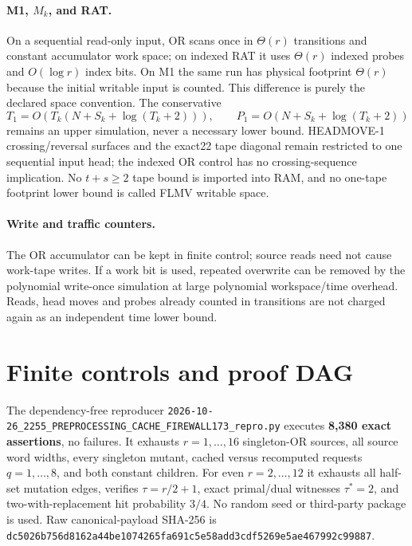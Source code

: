 \documentclass[11pt]{article}
\begin{document}
\paragraph{M1, $M_k$, and RAT.}
On a sequential read-only input, OR scans once in $\Theta(r)$ transitions and constant accumulator work space; on indexed RAT it uses $\Theta(r)$ indexed probes and $O(\log r)$ index bits.  On M1 the same run has physical footprint $\Theta(r)$ because the initial writable input is counted.  This difference is purely the declared space convention.  The conservative
\[
T_1=O(T_k(N+S_k+\log(T_k+2))),\qquad
P_1=O(N+S_k+\log(T_k+2))
\]
remains an upper simulation, never a necessary lower bound.  HEADMOVE-1 crossing/reversal surfaces and the exact22 tape diagonal remain restricted to one sequential input head; the indexed OR control has no crossing-sequence implication.  No $t+s\ge2$ tape bound is imported into RAM, and no one-tape footprint lower bound is called FLMV writable space.

\paragraph{Write and traffic counters.}
The OR accumulator can be kept in finite control; source reads need not cause work-tape writes.  If a work bit is used, repeated overwrite can be removed by the polynomial write-once simulation at large polynomial workspace/time overhead.  Reads, head moves and probes already counted in transitions are not charged again as an independent time lower bound.

\section{Finite controls and proof DAG}
The dependency-free reproducer \texttt{2026-10-26\_2255\_PREPROCESSING\_CACHE\_FIREWALL173\_repro.py} executes \textbf{8,380 exact assertions}, no failures.  It exhausts $r=1,\ldots,16$ singleton-OR sources, all source word widths, every singleton mutant, cached versus recomputed requests $q=1,\ldots,8$, and both constant children.  For even $r=2,\ldots,12$ it exhausts all half-set mutation edges, verifies $\tau=r/2+1$, exact primal/dual witnesses $\tau^*=2$, and two-with-replacement hit probability $3/4$.  No random seed or third-party package is used.  Raw canonical-payload SHA-256 is
\texttt{dc5026b756d8162a44be1074265fa691c5e58add3cdf5269e5ae467992c99887}.
\end{document}
